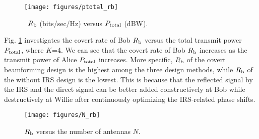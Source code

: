 \documentclass[10pt,journal,letterpaper,twocolumn,twoside]{IEEEtran} %
\begin{document}


 \begin{figure}[h]
          \centering
      \texttt{[image: figures/ptotal\_rb]}
 \caption{~$R_{\rm{b}}$ (bits/sec/Hz)  versus $P_{\rm{total}}$ (dBW).}
    \label{Ptotal_rb} %
\end{figure}

Fig. \ref{Ptotal_rb}  investigates the covert rate of Bob $R_{\rm{b}}$   versus the total transmit power $P_{\rm {total}}$, where $K$=4.
  We can see that  the covert rate of Bob $R_{\rm{b}}$ increases as the transmit power of Alice $P_{\rm {total}}$ increases.
 More specific,  $R_{\rm{b}}$  of the
 covert beamforming design is the highest among the three design methods, while $R_{\rm{b}}$  of the without IRS design is the lowest.
  This is because that the reflected signal by the IRS and the direct signal can be better added constructively at Bob while destructively at Willie after continuously optimizing the IRS-related phase shifts.



\begin{figure}[h]
      \centering
	\texttt{[image: figures/N\_rb]}
 \caption{ $R_{\rm{b}}$ versus the number of  antennas $N$.}
  \label{N_rb} %
\end{figure}
\end{document}
